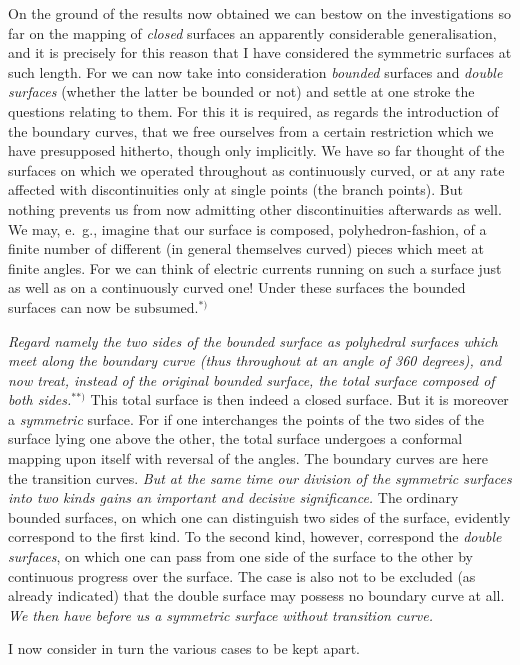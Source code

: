 \documentclass{article}
\begin{document}
On the ground of the results now obtained we can bestow on the investigations so far on the mapping of \emph{closed} surfaces an apparently considerable generalisation, and it is precisely for this reason that I have considered the symmetric surfaces at such length. For we can now take into consideration \emph{bounded} surfaces and \emph{double surfaces} (whether the latter be bounded or not) and settle at one stroke the questions relating to them. For this it is required, as regards the introduction of the boundary curves, that we free ourselves from a certain restriction which we have presupposed hitherto, though only implicitly. We have so far thought of the surfaces on which we operated throughout as continuously curved, or at any rate affected with discontinuities only at single points (the branch points). But nothing prevents us from now admitting other discontinuities afterwards as well. We may, e.\ g., imagine that our surface is composed, polyhedron-fashion, of a finite number of different (in general themselves curved) pieces which meet at finite angles. For we can think of electric currents running on such a surface just as well as on a continuously curved one! Under these surfaces the bounded surfaces can now be subsumed.${}^{*)}$

\emph{Regard namely the two sides of the bounded surface as polyhedral surfaces which meet along the boundary curve (thus throughout at an angle of 360 degrees), and now treat, instead of the original bounded surface, the total surface composed of both sides.}${}^{**)}$ This total surface is then indeed a closed surface. But it is moreover a \emph{symmetric} surface. For if one interchanges the points of the two sides of the surface lying one above the other, the total surface undergoes a conformal mapping upon itself with reversal of the angles. The boundary curves are here the transition curves. \emph{But at the same time our division of the symmetric surfaces into two kinds gains an important and decisive significance.} The ordinary bounded surfaces, on which one can distinguish two sides of the surface, evidently correspond to the first kind. To the second kind, however, correspond the \emph{double surfaces}, on which one can pass from one side of the surface to the other by continuous progress over the surface. The case is also not to be excluded (as already indicated) that the double surface may possess no boundary curve at all. \emph{We then have before us a symmetric surface without transition curve.}

I now consider in turn the various cases to be kept apart.
\end{document}
